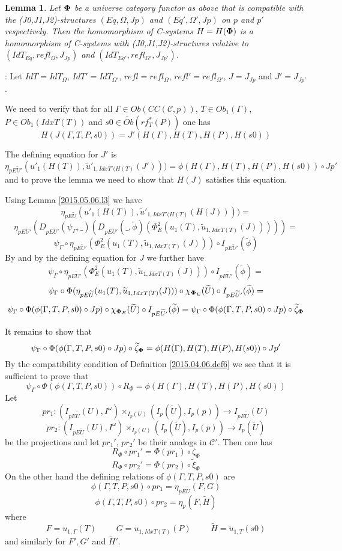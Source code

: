 \documentclass[12pt]{article}
\newenvironment{myproof}{{\bf Proof}:}{\vskip 5mm }
\newtheorem{lemma}[proposition]{Lemma}
\newcommand{\llabel}[1]{\label{#1}}
\newcommand{\sr}{\rightarrow}
\newcommand{\wt}{\widetilde}
\newcommand{\spc}{{\,\,\,\,\,\,\,}}
\begin{document}
\begin{lemma}
\llabel{2015.04.12.l3}
Let ${\bf\Phi}$ be a universe category functor as above that is compatible with the (J0,J1,J2)-structures $(Eq,\Omega,Jp)$ and $(Eq',\Omega',Jp)$ on $p$ and $p'$ respectively. Then the homomorphism of C-systems $H=H({\bf\Phi})$ is a homomorphism of C-systems with (J0,J1,J2)-structures relative to $(IdT_{Eq},refl_{\Omega},J_{Jp})$ and $(IdT_{Eq'},refl_{\Omega'},J_{Jp'})$.
\end{lemma}
%
\begin{myproof}
Let $IdT=IdT_{\Omega}$, $IdT'=IdT_{\Omega'}$, $refl=refl_{\Omega}$, $refl'=refl_{\Omega'}$, $J=J_{Jp}$ and $J'=J_{Jp'}$.

We need to verify that for all $\Gamma\in Ob(CC({\mathcal C},p))$, $T\in Ob_1(\Gamma)$, $P\in Ob_1(IdxT(T))$ and $s0\in \wt{Ob}(rf^*_T(P))$ one has
%
$$H(J(\Gamma,T,P,s0))=J'(H(\Gamma),H(T),H(P),H(s0))$$
%

The defining equation for $J'$ is
%
$$\eta_{pE\wt{U}'}(u'_1(H(T)),\wt{u}'_{1,{IdxT'(H(T)}}(J')))=\phi(H(\Gamma),H(T),H(P),H(s0))\circ Jp'$$
%
and to prove the lemma we need to show that $H(J)$ satisfies  this equation.

Using Lemma \ref{2015.05.06.l3} we have
%
$$\eta_{pE\wt{U}}(u'_1(H(T)),\wt{u}'_{1,{IdxT'(H(T)}}(H(J))))=$$$$\eta_{pE\wt{U}'}(D_{pE\wt{U}'}(\psi_{\Gamma},\_)(D_{pE\wt{U}'}(\_,\wt{\phi})(\Phi_E^2(u_1(T),\wt{u}_{1,IdxT(T)}(J)))))=$$
$$\psi_{\Gamma}\circ \eta_{pE\wt{U}'}(\Phi_E^2(u_1(T),\wt{u}_{1,IdxT(T)}(J)))\circ I_{pE\wt{U}'}(\wt{\phi})$$
%
By \cite[Lemma 5.8]{fromunivwithPi} and by the defining equation for $J$ we further have
%
$$\psi_{\Gamma}\circ \eta_{pE\wt{U}'}(\Phi_E^2(u_1(T),\wt{u}_{1,IdxT(T)}(J)))\circ I_{pE\wt{U}'}(\wt{\phi})=$$$$\psi_{\Gamma}\circ \Phi(\eta_{pE\wt{U}}(u_1(T),\wt{u}_{1,IdxT(T)}(J)))\circ \chi_{{\bf\Phi}_E}(\wt{U})\circ I_{pE\wt{U}'}(\wt{\phi})=$$
$$\psi_{\Gamma}\circ \Phi(\phi(\Gamma,T,P,s0)\circ Jp)\circ \chi_{{\bf\Phi}_E}(\wt{U})\circ I_{pE\wt{U}'}(\wt{\phi})=\psi_{\Gamma}\circ \Phi(\phi(\Gamma,T,P,s0)\circ Jp)\circ \wt{\zeta}_{\bf\Phi}$$
%

It remains to show that
%
$$\psi_{\Gamma}\circ \Phi(\phi(\Gamma,T,P,s0)\circ Jp)\circ \wt{\zeta}_{\bf\Phi}=\phi(H(\Gamma),H(T),H(P),H(s0))\circ Jp'$$
%
By the compatibility condition of Definition \ref{2015.04.06.def6} we see that it is sufficient to prove that 
%
$$\psi_{\Gamma}\circ \Phi(\phi(\Gamma,T,P,s0))\circ R_{\Phi} = \phi(H(\Gamma),H(T),H(P),H(s0))$$
%
Let 
%
$$pr_1:(I_{pE\wt{U}}(U),I^{\omega})\times_{I_{p}(U)}(I_{p}(\wt{U}),I_p(p))\sr I_{pE\wt{U}}(U)$$
$$pr_2:(I_{pE\wt{U}}(U),I^{\omega})\times_{I_{p}(U)}(I_{p}(\wt{U}),I_p(p))\sr I_{p}(\wt{U})$$
%
be the projections and let $pr_1'$, $pr_2'$ be their analogs in $\mathcal C'$. Then one has
%
$$R_{\Phi}\circ pr_1'=\Phi(pr_1)\circ \zeta_{\Phi}$$
$$R_{\Phi}\circ pr_2'=\Phi(pr_2)\circ \wt{\xi}_{\Phi}$$
%
On the other hand the defining relations of $\phi(\Gamma,T,P,s0)$ are
%
$$\phi(\Gamma,T,P,s0)\circ pr_1=\eta_{pE\wt{U}}(F,G)$$
$$\phi(\Gamma,T,P,s0)\circ pr_2=\eta_p(F,\wt{H})$$
%
where 
%
$$F=u_{1,\Gamma}(T)\spc\spc G=u_{1,IdxT(T)}(P)\spc\spc \wt{H}=\wt{u}_{1,T}(s0)$$
%
and similarly for $F',G'$ and $\wt{H}'$.


\end{myproof}
\end{document}
